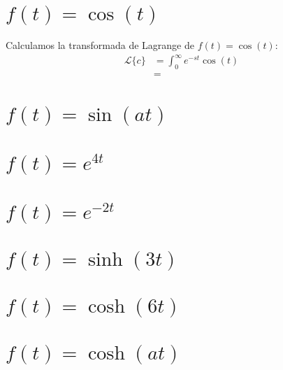 \documentclass[12pt, a4paper]{article}
\begin{document}
\sffamily


\newpage

\setcounter{section}{7}
\section{\texorpdfstring{\(f(t)=\cos(t)\)}{f (t) = cos (t)}}

Calculamos la transformada de Lagrange de \(f(t) = \cos(t)\):
\begin{align*}
	\mathcal{L}\{c\} &= \int_{0}^{\infty} e^{-st} \cos(t) \\
	&=
\end{align*}

\section{\texorpdfstring{\(f(t)=\sin(at)\)}{f (t) = sin (at)}}


\setcounter{section}{10}
\section{\texorpdfstring{\(f(t)=e^{4t}\)}{f (t) = e (4t) }}


\section{\texorpdfstring{\(f(t)=e^{-2t}\)}{f (t) = e (-2t)}}


\setcounter{section}{13}
\section{\texorpdfstring{\(f(t)=\sinh(3t)\)}{f (t) = sinh (3t)}}


\section{\texorpdfstring{\(f(t)=\cosh(6t)\)}{f (t) = cosh (6t)}}


\setcounter{section}{16}
\section{\texorpdfstring{\(f(t)=\cosh(at)\)}{f (t) = cosh (at)}}
\end{document}
